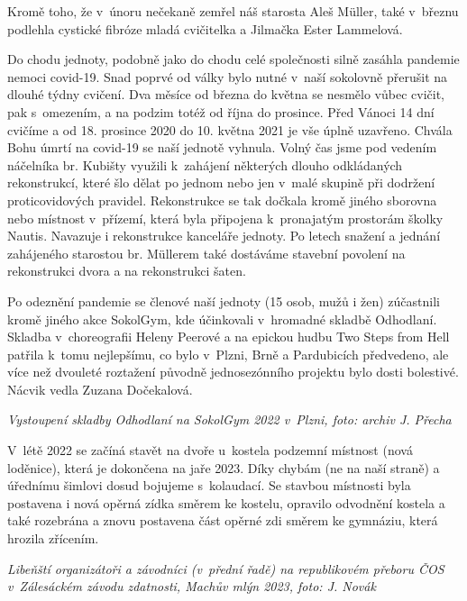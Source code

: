 \documentclass[a5paper, 12pt, twoside]{article}
\begin{document}
Kromě toho, že v~únoru nečekaně zemřel náš starosta Aleš Müller, také
v~březnu podlehla cystické fibróze mladá cvičitelka a Jilmačka Ester
Lammelová.

Do chodu jednoty, podobně jako do chodu celé společnosti silně zasáhla
pandemie nemoci covid-19. Snad poprvé od války bylo nutné v~naší
sokolovně přerušit na dlouhé týdny cvičení. Dva měsíce od března do
května se nesmělo vůbec cvičit, pak s~omezením, a na podzim totéž od
října do prosince. Před Vánoci 14 dní cvičíme a od 18. prosince 2020 do
10. května 2021 je vše úplně uzavřeno. Chvála Bohu úmrtí na covid-19 se
naší jednotě vyhnula. Volný čas jsme pod vedením náčelníka br. Kubišty
využili k~zahájení některých dlouho odkládaných rekonstrukcí, které šlo
dělat po jednom nebo jen v~malé skupině při dodržení proticovidových
pravidel. Rekonstrukce se tak dočkala kromě jiného sborovna nebo
místnost v~přízemí, která byla připojena k~pronajatým prostorám školky
Nautis. Navazuje i rekonstrukce kanceláře jednoty. Po letech snažení a
jednání zahájeného starostou br. Müllerem také dostáváme stavební
povolení na rekonstrukci dvora a na rekonstrukci šaten.

Po odeznění pandemie se členové naší jednoty (15 osob, mužů i žen)
zúčastnili kromě jiného akce SokolGym, kde účinkovali v~hromadné skladbě
Odhodlaní. Skladba v~choreografii Heleny Peerové a na epickou hudbu Two
Steps from Hell patřila k~tomu nejlepšímu, co bylo v~Plzni, Brně a
Pardubicích předvedeno, ale více než dvouleté roztažení původně
jednosezónního projektu bylo dosti bolestivé. Nácvik vedla Zuzana
Dočekalová.


\textit{Vystoupení skladby Odhodlaní na SokolGym 2022 v~Plzni, foto:
archiv J. Přecha}

V~létě 2022 se začíná stavět na dvoře u~kostela podzemní místnost (nová
loděnice), která je dokončena na jaře 2023. Díky chybám (ne na naší
straně) a úřednímu šimlovi dosud bojujeme s~kolaudací. Se stavbou
místnosti byla postavena i nová opěrná zídka směrem ke kostelu, opravilo
odvodnění kostela a také rozebrána a znovu postavena část opěrné zdi
směrem ke gymnáziu, která hrozila zřícením.


\textit{Libeňští organizátoři a závodníci (v~přední řadě) na republikovém
přeboru ČOS v~Zálesáckém závodu zdatnosti, Machův mlýn 2023, foto: J.
Novák}
\end{document}
